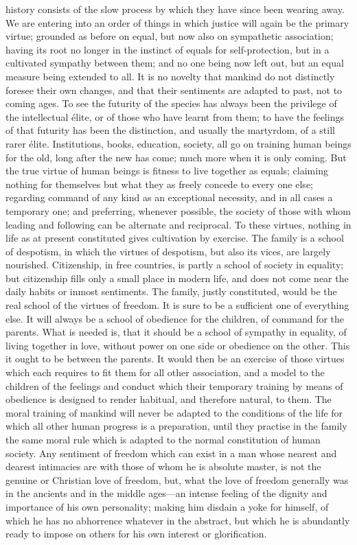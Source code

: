 \documentclass[12pt]{report}
\begin{document}
history consists of the slow process by which they have since been wearing away. We are entering into an order of things in which justice will again be the primary virtue; grounded as before on equal, but now also on sympathetic association; having its root no longer in the instinct of equals for self-protection, but in a cultivated sympathy between them; and no one being now left out, but an equal measure being extended to all. It is no novelty that mankind do not distinctly foresee their own changes, and that their sentiments are adapted to past, not to coming ages. To see the futurity of the species has always been the privilege of the intellectual élite, or of those who have learnt from them; to have the feelings of that futurity has been the distinction, and usually the martyrdom, of a still rarer élite. Institutions, books, education, society, all go on training human beings for the old, long after the new has come; much more when it is only coming. But the true virtue of human beings is fitness to live together as equals; claiming nothing for themselves but what they as freely concede to every one else; regarding command of any kind as an exceptional necessity, and in all cases a temporary one; and preferring, whenever possible, the society of those with whom leading and following can be alternate and reciprocal. To these virtues, nothing in life as at present constituted gives cultivation by exercise. The family is a school of despotism, in which the virtues of despotism, but also its vices, are largely nourished. Citizenship, in free countries, is partly a school of society in equality; but citizenship fills only a small place in modern life, and does not come near the daily habits or inmost sentiments. The family, justly constituted, would be the real school of the virtues of freedom. It is sure to be a sufficient one of everything else. It will always be a school of obedience for the children, of command for the parents. What is needed is, that it should be a school of sympathy in equality, of living together in love, without power on one side or obedience on the other. This it ought to be between the parents. It would then be an exercise of those virtues which each requires to fit them for all other association, and a model to the children of the feelings and conduct which their temporary training by means of obedience is designed to render habitual, and therefore natural, to them. The moral training of mankind will never be adapted to the conditions of the life for which all other human progress is a preparation, until they practise in the family the same moral rule which is adapted to the normal constitution of human society. Any sentiment of freedom which can exist in a man whose nearest and dearest intimacies are with those of whom he is absolute master, is not the genuine or Christian love of freedom, but, what the love of freedom generally was in the ancients and in the middle ages—an intense feeling of the dignity and importance of his own personality; making him disdain a yoke for himself, of which he has no abhorrence whatever in the abstract, but which he is abundantly ready to impose on others for his own interest or glorification.
\end{document}
